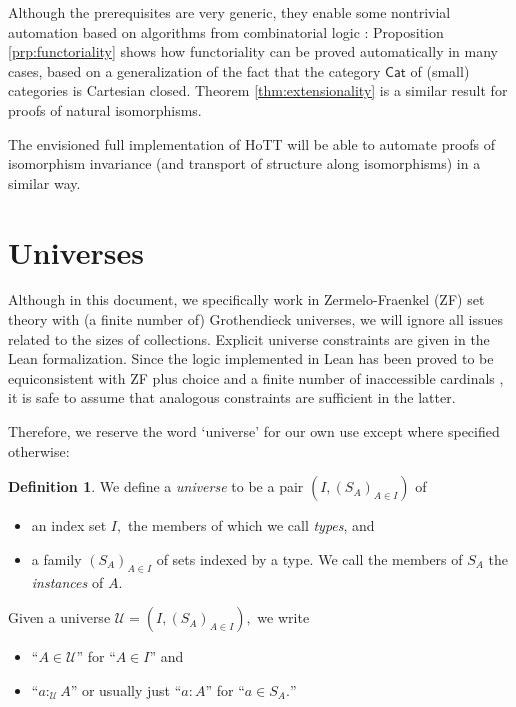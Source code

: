 \documentclass[a4paper]{article}
\theoremstyle{definition}
\newtheorem{definition}{Definition}[section]
\theoremstyle{remark}
\newcommand{\defn}{\emph}
\newcommand{\U}{\mathcal{U}}
\newcommand{\nm}{\mathsf}
\newcommand{\universe}{\nm}
\newcommand{\Cat}{\universe{Cat}}
\begin{document}
Although the prerequisites are very generic, they enable some nontrivial automation based on
algorithms from combinatorial logic \cite{combinators}: Proposition \ref{prp:functoriality} shows
how functoriality can be proved automatically in many cases, based on a generalization of the fact
that the category $\Cat$ of (small) categories is Cartesian closed. Theorem \ref{thm:extensionality}
is a similar result for proofs of natural isomorphisms.

The envisioned full implementation of HoTT will be able to automate proofs of isomorphism invariance
(and transport of structure along isomorphisms) in a similar way.

\section{Universes}
\label{sec:universes}

Although in this document, we specifically work in Zermelo-Fraenkel (ZF) set theory with (a finite
number of) Grothendieck universes, we will ignore all issues related to the sizes of collections.
Explicit universe constraints are given in the Lean formalization. Since the logic
implemented in Lean has been proved to be equiconsistent with ZF plus choice and a finite
number of inaccessible cardinals \cite{lean-type-theory}, it is safe to assume that analogous
constraints are sufficient in the latter.

Therefore, we reserve the word `universe' for our own use except where specified otherwise:

\begin{definition}
  \label{def:universe}
  We define a \defn{universe} to be a pair $(I, (S_A)_{A \in I})$ of
  \begin{itemize}
    \item an index set $I,$ the members of which we call \defn{types}, and
    \item a family $(S_A)_{A \in I}$ of sets indexed by a type. We call the members of $S_A$ the
    \defn{instances} of $A.$
  \end{itemize}
\end{definition}

Given a universe $\U = (I, (S_A)_{A \in I}),$ we write
\begin{itemize}
  \item ``$A \in \U$'' for ``$A \in I$'' and
  \item ``$a :_\U A$'' or usually just ``$a : A$'' for ``$a \in S_A.$''
\end{itemize}
\end{document}
